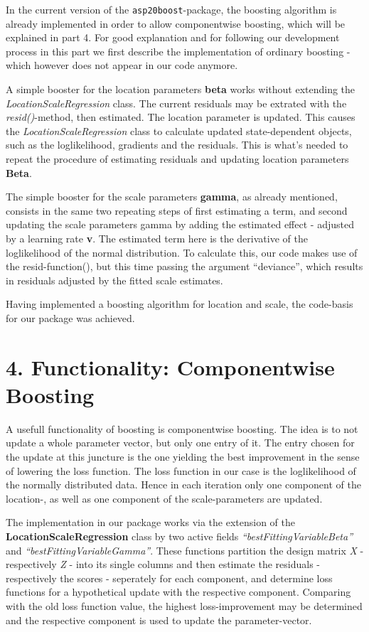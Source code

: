 \documentclass[
]{report}
\begin{document}
In the current version of the \texttt{asp20boost}-package, the boosting
algorithm is already implemented in order to allow componentwise
boosting, which will be explained in part 4. For good explanation and
for following our development process in this part we first describe the
implementation of ordinary boosting - which however does not appear in
our code anymore.

A simple booster for the location parameters \textbf{beta} works without
extending the \emph{LocationScaleRegression} class. The current
residuals may be extrated with the \emph{resid()}-method, then
estimated. The location parameter is updated. This causes the
\emph{LocationScaleRegression} class to calculate updated
state-dependent objects, such as the loglikelihood, gradients and the
residuals. This is what's needed to repeat the procedure of estimating
residuals and updating location parameters \textbf{Beta}.

The simple booster for the scale parameters \textbf{gamma}, as already
mentioned, consists in the same two repeating steps of first estimating
a term, and second updating the scale parameters gamma by adding the
estimated effect - adjusted by a learning rate \textbf{v}. The estimated
term here is the derivative of the loglikelihood of the normal
distribution. To calculate this, our code makes use of the
resid-function(), but this time passing the argument ``deviance'', which
results in residuals adjusted by the fitted scale estimates.

Having implemented a boosting algorithm for location and scale, the
code-basis for our package was achieved.

\hypertarget{functionality-componentwise-boosting}{%
\chapter{4. Functionality: Componentwise
Boosting}\label{functionality-componentwise-boosting}}

A usefull functionality of boosting is componentwise boosting. The idea
is to not update a whole parameter vector, but only one entry of it. The
entry chosen for the update at this juncture is the one yielding the
best improvement in the sense of lowering the loss function. The loss
function in our case is the loglikelihood of the normally distributed
data. Hence in each iteration only one component of the location-, as
well as one component of the scale-parameters are updated.

The implementation in our package works via the extension of the
\textbf{LocationScaleRegression} class by two active fields
\emph{``bestFittingVariableBeta''} and
\emph{``bestFittingVariableGamma''}. These functions partition the
design matrix \emph{X} - respectively \emph{Z} - into its single columns
and then estimate the residuals - respectively the scores - seperately
for each component, and determine loss functions for a hypothetical
update with the respective component. Comparing with the old loss
function value, the highest loss-improvement may be determined and the
respective component is used to update the parameter-vector.
\end{document}
